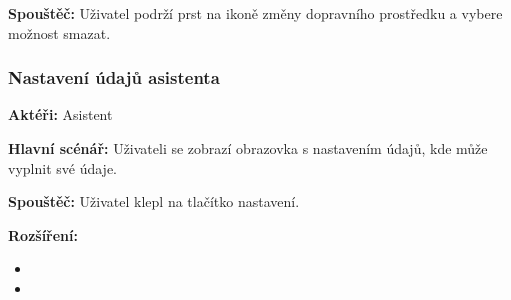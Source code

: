 \documentclass{article}
\newcommand{\usecase}[2]{\subsubsection{#1}\label{#2}}
\begin{document}
\vspace{0.1cm}
\noindent
\textbf{Spouštěč:} Uživatel podrží prst na ikoně změny dopravního prostředku a vybere možnost smazat.


\usecase{Nastavení údajů asistenta}{nastaveniudaju}
\textbf{Aktéři:} Asistent

\vspace{0.1cm}
\noindent
\textbf{Hlavní scénář:} Uživateli se zobrazí obrazovka s nastavením údajů, kde může vyplnit své údaje.

\vspace{0.1cm}
\noindent
\textbf{Spouštěč:} Uživatel klepl na tlačítko nastavení.

\vspace{0.1cm}
\noindent
\textbf{Rozšíření:}
\begin{itemize}
  \item {}
  \item {}
\end{itemize}
\end{document}
